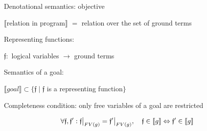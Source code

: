 \documentclass{beamer}
\newcommand{\sembr}[1]{\llbracket{#1}\rrbracket}
\theoremstyle{definition}
\theoremstyle{plain} %
\begin{document}
\begin{frame}{Denotational semantics: objective}

\begin{center}
$\llbracket$relation in program$\rrbracket$ $=$ relation over the set of ground terms
\end{center}

\pause

\vskip5mm

Representing functions:

\begin{center}
${\mathfrak f} \colon$ logical variables $\to$ ground terms
\end{center}

Semantics of a goal:

\begin{center}
$\sembr{goal} \subset \{ {\mathfrak f} \mid {\mathfrak f}$ is a representing function$\}$
\end{center}

\pause

\vskip5mm

Completeness condition: only free variables of a goal are restricted

\[\forall {\mathfrak f}, {\mathfrak f'}:  {\mathfrak f}\big{|}_{FV(g)} = {\mathfrak f'}\big{|}_{FV(g)}, \quad {\mathfrak f} \in \sembr{g} \Leftrightarrow {\mathfrak f'} \in \sembr{g}\]




\end{frame}
\end{document}
